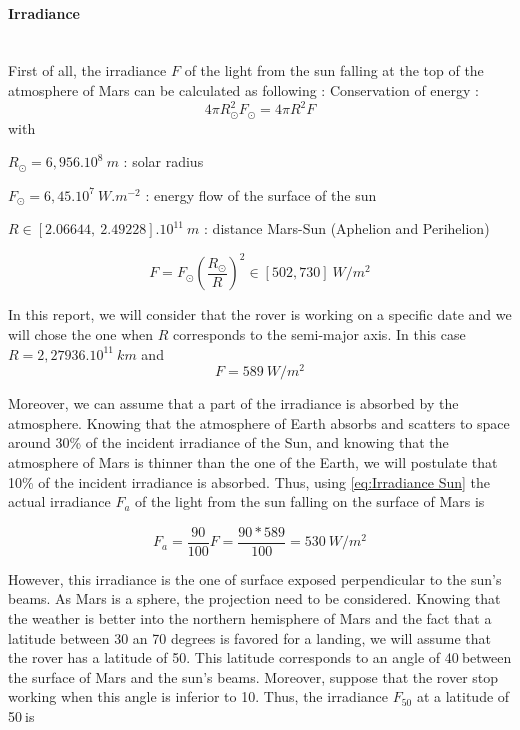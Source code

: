 \paragraph{Irradiance}
~\\
First of all, the irradiance $F$ of the light from the sun falling at the top of the atmosphere of Mars can be calculated as following :
Conservation of energy :
\begin{equation}
\label{eq:conservation of energy}
4\pi R_\odot^2F_\odot=4\pi R^2F
\end{equation}
with 

$R_\odot=6,956.10^8\ m$ : solar radius

$F_\odot=6,45.10^7\ W.m^{-2}$ : energy flow of the surface of the sun

$R \in [2.06644,\ 2.49228].10^{11} \ m$ : distance Mars-Sun (Aphelion and Perihelion)

\begin{equation}
\label{eq:Irradiance Sun range}
F = F_\odot \left(\frac{R_\odot}{R}\right)^2 \in [502, 730]\ W/m^2
\end{equation}

In this report, we will consider that the rover is working on a specific date and we will chose the one when $R$ corresponds to the semi-major axis. In this case $R=2,27936.10^{11}\ km$ and
\begin{equation}
\label{eq:Irradiance Sun}
F = 589\ W/m^2
\end{equation}



Moreover, we can assume that a part of the irradiance is absorbed by the atmosphere. Knowing that the atmosphere of Earth absorbs and scatters to space around 30\% of the incident irradiance of the Sun\cite{yamamoto1962direct}, and knowing  that the atmosphere of Mars is thinner than the one of the Earth, we will postulate that 10\% of the incident irradiance is absorbed. Thus, using \eqref{eq:Irradiance Sun} the actual irradiance $F_a$ of the light from the sun falling on the surface of Mars is

\begin{equation}
\label{eq:Actual Irradiance Sun}
F_a = \frac{90}{100}F = \frac{90*589}{100} = 530\ W/m^2
\end{equation}

However, this irradiance is the one of surface exposed perpendicular to the sun's beams. As Mars is a sphere, the projection need to be considered.
Knowing that the weather is better into the northern hemisphere of Mars\cite{wiki:weather} and the fact that a latitude between 30 an 70 degrees is favored for a landing\cite{latitude}, we will assume that the rover has a latitude of 50\textdegree. This latitude corresponds to an angle of 40\textdegree$\ $between the surface of Mars and the sun's beams. Moreover, suppose that the rover stop working when this angle is inferior to 10\textdegree. Thus, the irradiance $F_{50}$ at a latitude of 50\textdegree$\ $is

